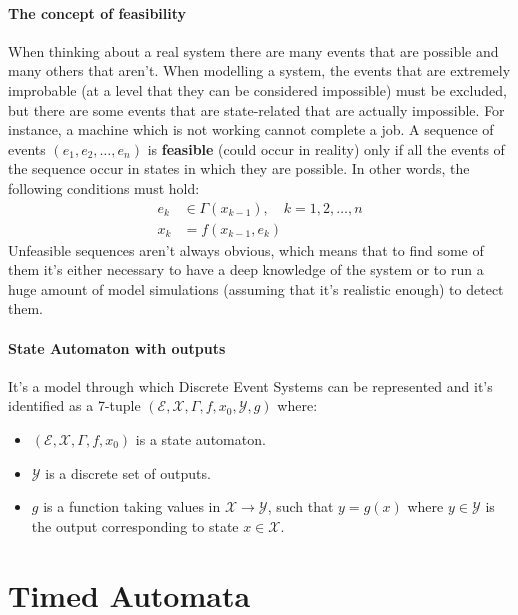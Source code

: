 \documentclass[12pt,a4paper]{article}
\begin{document}
\paragraph{The concept of feasibility} When thinking about a real system there are many events that are possible and many others that aren’t. When modelling a system, the events that are extremely improbable (at a level that they can be considered impossible) must be excluded, but there are some events that are state-related that are actually impossible. For instance, a machine which is not working cannot complete a job. A sequence of events $(e_1,e_2,\dots,e_n)$ is \textbf{feasible} (could occur in reality) only if all the events of the sequence occur in states in which they are possible. In other words, the following conditions must hold:
\begin{align*}
e_k &\in \Gamma (x_{k-1}), \quad k = 1,2,\dots,n \\ 
x_k &= f(x_{k-1},e_k)
\end{align*}
Unfeasible sequences aren’t always obvious, which means that to find some of them it’s either necessary to have a deep knowledge of the system or to run a huge amount of model simulations (assuming that it’s realistic enough) to detect them.

\paragraph{State Automaton with outputs} It’s a model through which Discrete Event Systems can be represented and it’s identified as a 7-tuple $(\mathcal{E},\mathcal{X},\Gamma,f,x_0,\mathcal{Y},g)$ where:
\begin{itemize}
\item $(\mathcal{E},\mathcal{X},\Gamma,f,x_0)$ is a state automaton.
\item $\mathcal{Y}$ is a discrete set of outputs.
\item $g$ is a function taking values in $\mathcal{X}\rightarrow\mathcal{Y}$, such that $y=g(x)$ where $y\in\mathcal{Y}$ is the output corresponding to state $x\in\mathcal{X}$.
\end{itemize}

\section{Timed Automata}
\end{document}
